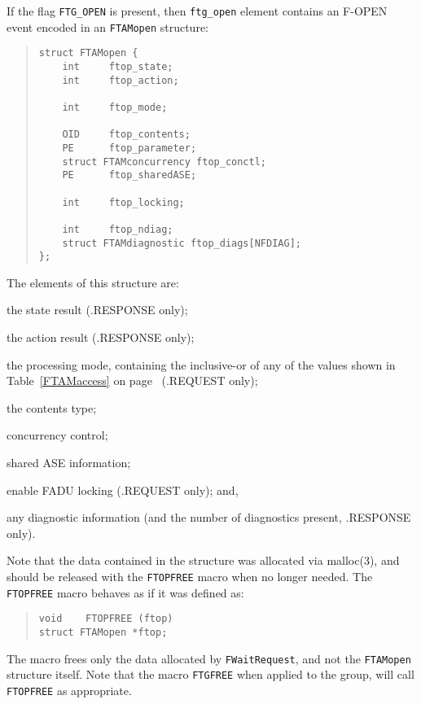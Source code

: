 If the flag \verb"FTG_OPEN" is present,
then \verb"ftg_open" element contains an {\sf F-OPEN\/} event encoded in an
\verb"FTAMopen" structure:
\begin{quote}\small\begin{verbatim}
struct FTAMopen {
    int     ftop_state;
    int     ftop_action;

    int     ftop_mode;

    OID     ftop_contents;
    PE      ftop_parameter;
    struct FTAMconcurrency ftop_conctl;
    PE      ftop_sharedASE;

    int     ftop_locking;

    int     ftop_ndiag;
    struct FTAMdiagnostic ftop_diags[NFDIAG];
};
\end{verbatim}\end{quote}
The elements of this structure are:
\begin{describe}
\item[\verb"ftop\_state":] the state result ({\sf .RESPONSE\/} only);

\item[\verb"ftop\_action":] the action result ({\sf .RESPONSE\/} only);

\item[\verb"ftop\_mode":] the processing mode,
containing the inclusive-or of any of the values shown in
Table~\ref{FTAMaccess} on page~\pageref{FTAMaccess}
({\sf .REQUEST\/} only);

\item[\verb"ftop\_contents"/\verb"ftop\_parameter":] the contents type;

\item[\verb"ftop\_conctl":] concurrency control;

\item[\verb"ftop\_sharedASE":] shared ASE information;

\item[\verb"ftop\_locking":] enable FADU locking ({\sf .REQUEST\/} only);
and,

\item[\verb"ftop\_diags"/\verb"ftop\_ndiag":] any diagnostic information
(and the number of diagnostics present, {\sf .RESPONSE\/} only).
\end{describe}
Note that the data contained in the structure was allocated via \man malloc(3),
and should be released with the \verb"FTOPFREE" macro when no longer needed.
The \verb"FTOPFREE" macro
behaves as if it was defined as:
\begin{quote}\small\begin{verbatim}
void    FTOPFREE (ftop)
struct FTAMopen *ftop;
\end{verbatim}\end{quote}
The macro frees only the data allocated by \verb"FWaitRequest",
and not the \verb"FTAMopen" structure itself.
Note that the macro \verb"FTGFREE" when applied to the group,
will call \verb"FTOPFREE" as appropriate.

